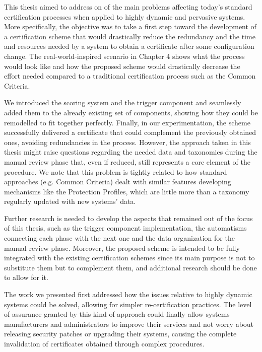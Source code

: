 This thesis aimed to address on of the main problems affecting today's standard certification processes when applied to highly dynamic and pervasive systems. More specifically, the objective was to take a first step toward the development of a certification scheme that would drastically reduce the redundancy and the time and resources needed by a system to obtain a certificate after some configuration change. The real-world-inspired scenario in Chapter 4 shows what the process would look like and how the proposed scheme would drastically decrease the effort needed compared to a traditional certification process such as the Common Criteria.

We introduced the scoring system and the trigger component and seamlessly added them to the already existing set of components, showing how they could be remodelled to fit together perfectly. Finally, in our experimentation, the scheme successfully delivered a certificate that could complement the previously obtained ones, avoiding redundancies in the process. However, the approach taken in this thesis might raise questions regarding the needed data and taxonomies during the manual review phase that, even if reduced, still represents a core element of the procedure. We note that this problem is tightly related to how standard approaches (e.g. Common Criteria) dealt with similar features developing mechanisms like the Protection Profiles, which are little more than a taxonomy regularly updated with new systems' data.

Further research is needed to develop the aspects that remained out of the focus of this thesis, such as the trigger component implementation, the automatisms connecting each phase with the next one and the data organization for the manual review phase. Moreover, the proposed scheme is intended to be fully integrated with the existing certification schemes since its main purpose is not to substitute them but to complement them, and additional research should be done to allow for it.

The work we presented first addressed how the issues relative to highly dynamic systems could be solved, allowing for simpler re-certification practices. The level of assurance granted by this kind of approach could finally allow systems manufacturers and administrators to improve their services and not worry about releasing security patches or upgrading their systems, causing the complete invalidation of certificates obtained through complex procedures. 